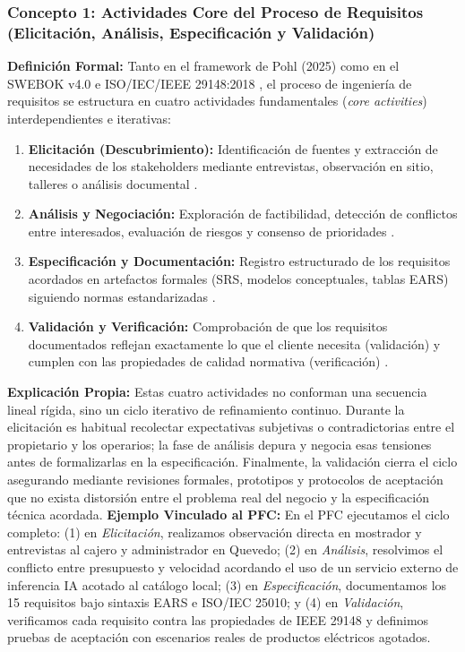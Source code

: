 \documentclass[conference,10pt]{IEEEtran}
\begin{document}
	\subsubsection{Concepto 1: Actividades Core del Proceso de Requisitos (Elicitación, Análisis, Especificación y Validación)}
	\textbf{Definición Formal:} Tanto en el framework de Pohl (2025) \cite{pohl2025} como en el SWEBOK v4.0 \cite{swebok2024} e ISO/IEC/IEEE 29148:2018 \cite{ieee29148}, el proceso de ingeniería de requisitos se estructura en cuatro actividades fundamentales (\textit{core activities}) interdependientes e iterativas:
	\begin{enumerate}
		\item \textbf{Elicitación (Descubrimiento):} Identificación de fuentes y extracción de necesidades de los stakeholders mediante entrevistas, observación en sitio, talleres o análisis documental \cite{pohl2025, wiegers2013}.
		\item \textbf{Análisis y Negociación:} Exploración de factibilidad, detección de conflictos entre interesados, evaluación de riesgos y consenso de prioridades \cite{swebok2024, ireb2023}.
		\item \textbf{Especificación y Documentación:} Registro estructurado de los requisitos acordados en artefactos formales (SRS, modelos conceptuales, tablas EARS) siguiendo normas estandarizadas \cite{ieee29148, mavin2009ears}.
		\item \textbf{Validación y Verificación:} Comprobación de que los requisitos documentados reflejan exactamente lo que el cliente necesita (validación) y cumplen con las propiedades de calidad normativa (verificación) \cite{ieee29148, pohl2025}.
	\end{enumerate}
	\textbf{Explicación Propia:} Estas cuatro actividades no conforman una secuencia lineal rígida, sino un ciclo iterativo de refinamiento continuo. Durante la elicitación es habitual recolectar expectativas subjetivas o contradictorias entre el propietario y los operarios; la fase de análisis depura y negocia esas tensiones antes de formalizarlas en la especificación. Finalmente, la validación cierra el ciclo asegurando mediante revisiones formales, prototipos y protocolos de aceptación que no exista distorsión entre el problema real del negocio y la especificación técnica acordada.
	\textbf{Ejemplo Vinculado al PFC:} En el PFC ejecutamos el ciclo completo: (1) en \textit{Elicitación}, realizamos observación directa en mostrador y entrevistas al cajero y administrador en Quevedo; (2) en \textit{Análisis}, resolvimos el conflicto entre presupuesto y velocidad acordando el uso de un servicio externo de inferencia IA acotado al catálogo local; (3) en \textit{Especificación}, documentamos los 15 requisitos bajo sintaxis EARS e ISO/IEC 25010; y (4) en \textit{Validación}, verificamos cada requisito contra las propiedades de IEEE 29148 y definimos pruebas de aceptación con escenarios reales de productos eléctricos agotados.
\end{document}
